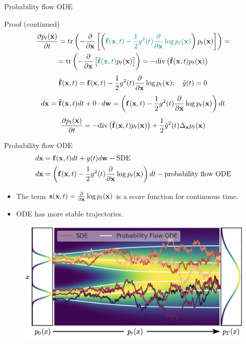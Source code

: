 \begin{frame}{Probability flow ODE}
	\begin{block}{Proof (continued)}
 		\vspace{-0.7cm}
 		\begin{multline*}
 			\frac{\partial p_t(\mathbf{x})}{\partial t} =  \text{tr}\left(- \frac{\partial}{\partial \mathbf{x}} \left[ \left( {\color{teal}\mathbf{f}(\mathbf{x}, t) - \frac{1}{2} g^2(t) \frac{\partial}{\partial \mathbf{x}}\log p_t(\mathbf{x})}\right) p_t(\mathbf{x}) \right]  \right) =\\
 			  =  \text{tr}\left(- \frac{\partial}{\partial \mathbf{x}} \left[ {\color{teal}\tilde{\mathbf{f}}(\mathbf{x}, t)} p_t(\mathbf{x}) \right]  \right) = -  \text{div}\left(\tilde{\mathbf{f}}(\mathbf{x}, t) p_t(\mathbf{x})\right) 
 		\end{multline*}
		\[
			\tilde{\mathbf{f}}(\mathbf{x}, t) = \mathbf{f}(\mathbf{x}, t) -\frac{1}{2} g^2(t) \frac{\partial}{\partial \mathbf{x}} \log p_t(\mathbf{x}); \quad \tilde{g}(t) = 0
		\]
	 	\[
	 		d \mathbf{x} = \tilde{\mathbf{f}}(\mathbf{x}, t) dt + 0 \cdot d \mathbf{w} = \left(\mathbf{f}(\mathbf{x}, t) -\frac{1}{2} g^2(t) \frac{\partial}{\partial \mathbf{x}} \log p_t(\mathbf{x}) \right) dt
	 	\]
		\[
			\frac{\partial p_t(\mathbf{x})}{\partial t} = - \text{div}\left(\tilde{\mathbf{f}}(\mathbf{x}, t) p_t(\mathbf{x})\right) + \frac{1}{2}\tilde{g}^2(t) \Delta_{\mathbf{x}}p_t(\mathbf{x})
		\]
 	\end{block}
\end{frame}
\begin{frame}{Probability flow ODE}
	\vspace{-0.5cm}
	\begin{align*}
		d\mathbf{x} &= \mathbf{f}(\mathbf{x}, t) dt + g(t) d \mathbf{w} - \text{SDE} \\
		d\mathbf{x} &= \left(\mathbf{f}(\mathbf{x}, t) -\frac{1}{2} g^2(t) \frac{\partial}{\partial \mathbf{x}} \log p_t(\mathbf{x}) \right) dt  - \text{probability flow ODE}
	\end{align*}
	\vspace{-0.3cm}
	\begin{itemize}
		\item The term $\mathbf{s}(\mathbf{x}, t) = \frac{\partial}{\partial \mathbf{x}} \log p_t(\mathbf{x})$ is a score function for continuous time.
		\item ODE has more stable trajectories.
	\end{itemize}
	\begin{figure}
		\includegraphics[width=0.75\linewidth]{figs/probability_flow}
	\end{figure}
\end{frame}
